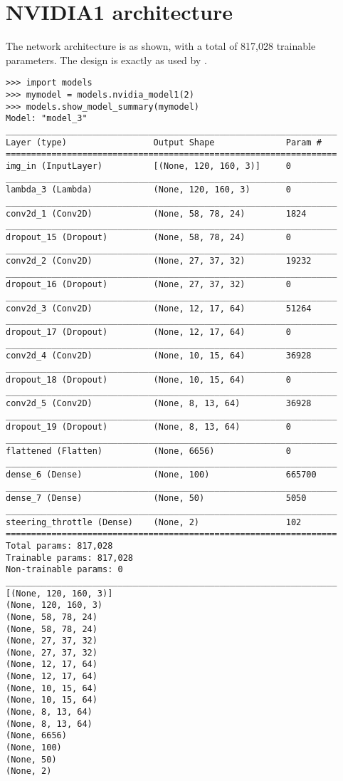 \section{NVIDIA1 architecture}
\label{arc:nvidia1}
The network architecture is as shown, with a total of 817,028 trainable parameters. The design is exactly as used by \cite{SDSandboxSim}.
\begin{verbatim}
>>> import models
>>> mymodel = models.nvidia_model1(2)
>>> models.show_model_summary(mymodel)
Model: "model_3"
_________________________________________________________________
Layer (type)                 Output Shape              Param #   
=================================================================
img_in (InputLayer)          [(None, 120, 160, 3)]     0         
_________________________________________________________________
lambda_3 (Lambda)            (None, 120, 160, 3)       0         
_________________________________________________________________
conv2d_1 (Conv2D)            (None, 58, 78, 24)        1824      
_________________________________________________________________
dropout_15 (Dropout)         (None, 58, 78, 24)        0         
_________________________________________________________________
conv2d_2 (Conv2D)            (None, 27, 37, 32)        19232     
_________________________________________________________________
dropout_16 (Dropout)         (None, 27, 37, 32)        0         
_________________________________________________________________
conv2d_3 (Conv2D)            (None, 12, 17, 64)        51264     
_________________________________________________________________
dropout_17 (Dropout)         (None, 12, 17, 64)        0         
_________________________________________________________________
conv2d_4 (Conv2D)            (None, 10, 15, 64)        36928     
_________________________________________________________________
dropout_18 (Dropout)         (None, 10, 15, 64)        0         
_________________________________________________________________
conv2d_5 (Conv2D)            (None, 8, 13, 64)         36928     
_________________________________________________________________
dropout_19 (Dropout)         (None, 8, 13, 64)         0         
_________________________________________________________________
flattened (Flatten)          (None, 6656)              0         
_________________________________________________________________
dense_6 (Dense)              (None, 100)               665700    
_________________________________________________________________
dense_7 (Dense)              (None, 50)                5050      
_________________________________________________________________
steering_throttle (Dense)    (None, 2)                 102       
=================================================================
Total params: 817,028
Trainable params: 817,028
Non-trainable params: 0
_________________________________________________________________
[(None, 120, 160, 3)]
(None, 120, 160, 3)
(None, 58, 78, 24)
(None, 58, 78, 24)
(None, 27, 37, 32)
(None, 27, 37, 32)
(None, 12, 17, 64)
(None, 12, 17, 64)
(None, 10, 15, 64)
(None, 10, 15, 64)
(None, 8, 13, 64)
(None, 8, 13, 64)
(None, 6656)
(None, 100)
(None, 50)
(None, 2)    
\end{verbatim}

